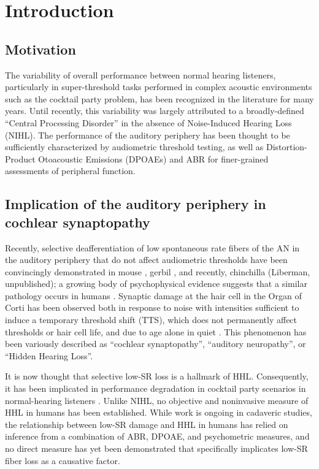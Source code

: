 \chapter{Introduction}
\label{chapter:Introduction}
\thispagestyle{myheadings}
\section{Motivation}
The variability of overall performance between normal hearing listeners, particularly in super-threshold tasks performed in complex acoustic environments such as the cocktail party problem, has been recognized in the literature for many years.  Until recently, this variability was largely attributed to a broadly-defined ``Central Processing Disorder'' in the absence of Noise-Induced Hearing Loss (NIHL). The performance of the auditory periphery has been thought to be sufficiently characterized by audiometric threshold testing, as well as Distortion-Product Otoacoustic Emissions (DPOAEs) and ABR for finer-grained assessments of peripheral function.

\section{Implication of the auditory periphery in cochlear synaptopathy}
Recently, selective deafferentiation of low spontaneous rate fibers of the AN in the auditory periphery that do not affect audiometric thresholds have been convincingly demonstrated in mouse \citep{Kujawa2009Adding}, gerbil \citep{Furman2013NoiseInduced}, and recently, chinchilla (Liberman, unpublished); a growing body of psychophysical evidence suggests that a similar pathology occurs in humans \citep{Bharadwaj2015Individual}.  Synaptic damage at the hair cell in the Organ of Corti has been observed both in response to noise with intensities sufficient to induce a temporary threshold shift (TTS), which does not permanently affect thresholds or hair cell life, and due to age alone in quiet \citep{Sergeyenko2013AgeRelated,Fernandez2015Aging}. This phenomenon has been variously described as ``cochlear synaptopathy''\citep{Bharadwaj2014Cochlear}, ``auditory neuropathy'', or ``Hidden Hearing Loss''.  

It is now thought that selective low-SR loss is a hallmark of HHL.  Consequently, it has been implicated in performance degradation in cocktail party scenarios in normal-hearing listeners \citep{Bharadwaj2015Individual,Bharadwaj2014Cochlear}.  Unlike NIHL, no objective and noninvasive measure of HHL in humans has been established.  While work is ongoing in cadaveric studies, the relationship between low-SR damage and HHL in humans has relied on inference from a combination of ABR, DPOAE, and psychometric measures, and no direct measure has yet been demonstrated that specifically implicates low-SR fiber loss as a causative factor.

